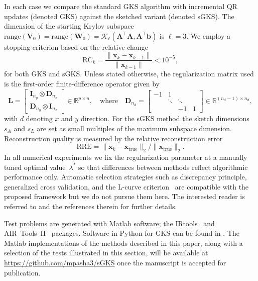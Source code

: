 \documentclass[%
  a4paper,
  onecolumn,
  colorlinks,
]{preprint}
\theoremstyle{plain}
\theoremstyle{definition}
\newcommand{\R}{\ensuremath{\mathbb{R}}}
\newcommand{\Kry}{\mathcal{K}}          %
\newcommand{\bA}{\ensuremath{\boldsymbol{A}}}
\newcommand{\bD}{\ensuremath{\boldsymbol{D}}}
\newcommand{\bI}{\ensuremath{\boldsymbol{I}}}
\newcommand{\bL}{\ensuremath{\boldsymbol{L}}}
\newcommand{\bV}{\ensuremath{\boldsymbol{V}}}
\newcommand{\bW}{\ensuremath{\boldsymbol{W}}}
\newcommand{\bb}{\mathbf{b}}
\newcommand{\bx}{\mathbf{x}}
\begin{document}
In each case we compare the standard GKS algorithm with incremental QR
updates (denoted GKS) against the sketched variant (denoted sGKS).
The dimension of the starting Krylov subspace $\text{range}(\bV_0)=\text{range}(\bW_0)=\Kry_\ell(\bA^\top\bA, \bA^\top\bb)$  is $\ell = 3$. 
 We employ a stopping criterion based on the
relative change
\begin{equation}\label{eq:RC}
  \mathrm{RC}_k
  = \frac{\|\bx_k - \bx_{k-1}\|}{\|\bx_{k-1}\|}
  < 10^{-5},
\end{equation}
for both GKS and sGKS. Unless stated otherwise,
the regularization 
matrix used is the first-order finite-difference operator given by
\begin{equation}\label{eq: reg_matrix}
  \bL = \begin{bmatrix} \bI_{n_y} \otimes \bD_{n_x} \\
        \bD_{n_y} \otimes \bI_{n_x} \end{bmatrix}
  \in \R^{p \times n}, \quad \text{where} \quad
  \bD_{n_d} = \begin{bmatrix} -1 & 1 & & \\ & \ddots & \ddots & \\ & & -1 & 1
          \end{bmatrix} \in \R^{(n_d-1) \times n_d}, 
\end{equation}
with $d$ denoting $x$ and $y$ direction.
For the sGKS method the sketch
dimensions $s_A$ and $s_L$ are set
as small multiples of the maximum subspace dimension.
Reconstruction quality is measured by the relative reconstruction error
\begin{equation}
\mathrm{RRE} = \|\bx_k - \bx_{\mathrm{true}}\|_2 / \|\bx_{\mathrm{true}}\|_2
.
\end{equation}
In all numerical experiments we fix the regularization parameter at a manually tuned optimal value~$\lambda^*$ so that differences between methods reflect algorithmic performance only. Automatic selection strategies such as discrepancy principle, generalized cross validation, and the L-curve criterion~\cite{Reichel03,CalvettiReichel03,LRV12, buccini2021generalized} are compatible with the proposed framework but we do not pursue them here. The interested reader is referred to \cite{buccini2024software} and the references therein for further details.

Test problems are generated with Matlab software; the IRtools~\cite{GazzolaNagyPer19} and
AIR~Tools~II~\cite{hansen2018air} packages. Software in Python for GKS can be found in \cite{pasha2025trips}. The Matlab implementations of the methods described in this paper, along with a selection of the tests illustrated in this section, will be available at \url{https://github.com/mpasha3/sGKS} once the manuscript is accepted for publication.
\end{document}
